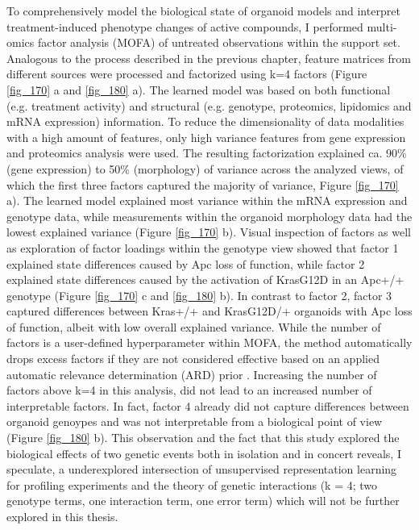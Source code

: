 \begin{flushleft}
To comprehensively model the biological state of organoid models and interpret treatment-induced phenotype changes of active compounds, I performed multi-omics factor analysis (MOFA) of untreated observations within the support set. Analogous to the process described in the previous chapter, feature matrices from different sources were processed and factorized using k=4 factors (Figure \ref{fig_170} a and \ref{fig_180} a). The learned model was based on both functional (e.g. treatment activity) and structural (e.g. genotype, proteomics, lipidomics and mRNA expression) information. To reduce the dimensionality of data modalities with a high amount of features, only high variance features from gene expression and proteomics analysis were used. The resulting factorization explained ca. 90\% (gene expression) to 50\% (morphology) of variance across the analyzed views, of which the first three factors captured the majority of variance, Figure \ref{fig_170} a). The learned model explained most variance within the mRNA expression and genotype data, while measurements within the organoid morphology data had the lowest explained variance (Figure \ref{fig_170} b). Visual inspection of factors as well as exploration of factor loadings within the genotype view showed that factor 1 explained state differences caused by Apc loss of function, while factor 2 explained state differences caused by the activation of KrasG12D in an Apc+/+ genotype (Figure \ref{fig_170} c and \ref{fig_180} b). In contrast to factor 2, factor 3 captured differences between Kras+/+ and KrasG12D/+ organoids with Apc loss of function, albeit with low overall explained variance. While the number of factors is a user-defined hyperparameter within MOFA, the method automatically drops excess factors if they are not considered effective based on an applied automatic relevance determination (ARD) prior \cite{Argelaguet2018-yi}. Increasing the number of factors above k=4 in this analysis, did not lead to an increased number of interpretable factors. In fact, factor 4 already did not capture differences between organoid genoypes and was not interpretable from a biological point of view (Figure \ref{fig_180} b). This observation and the fact that this study explored the biological effects of two genetic events both in isolation and in concert reveals, I speculate, a underexplored intersection of unsupervised representation learning for profiling experiments and the theory of genetic interactions (k = 4; two genotype terms, one interaction term, one error term) which will not be further explored in this thesis. 


\end{flushleft}
